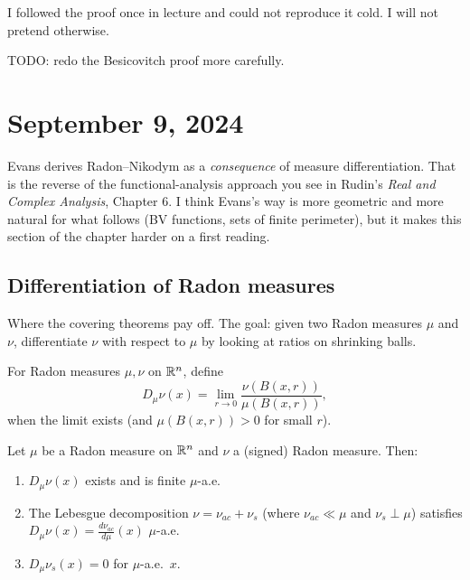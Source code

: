 I followed the proof once in lecture and could not reproduce it cold. I will not pretend otherwise.

TODO: redo the Besicovitch proof more carefully.


\section{September 9, 2024}\label{sec:lec4}

Evans derives Radon--Nikodym as a \emph{consequence} of measure
differentiation. That is the reverse of the functional-analysis approach you see in Rudin's \emph{Real and Complex Analysis}, Chapter 6. I think Evans's way is more geometric and more natural for what follows
(BV functions, sets of finite perimeter), but it makes this section of the
chapter harder on a first reading.

\subsection{Differentiation of Radon measures}\label{subsec:differentiation}

Where the covering theorems pay off. The goal: given two Radon
measures $\mu$ and $\nu$, differentiate $\nu$ with respect to $\mu$ by
looking at ratios on shrinking balls.

\begin{definition}\label{def:measure-deriv}
For Radon measures $\mu, \nu$ on $\mathbb{R}^n$, define
\[
  D_\mu \nu(x) = \lim_{r \to 0} \frac{\nu(B(x,r))}{\mu(B(x,r))},
\]
when the limit exists (and $\mu(B(x,r)) > 0$ for small $r$).
\end{definition}

\begin{theorem}%
\label{thm:lebesgue-besicovitch}
Let $\mu$ be a Radon measure on $\mathbb{R}^n$ and $\nu$ a (signed) Radon
measure. Then:
\begin{enumerate}[nosep]
  \item $D_\mu \nu(x)$ exists and is finite $\mu$-a.e.
  \item The Lebesgue decomposition $\nu = \nu_{ac} + \nu_s$ (where
        $\nu_{ac} \ll \mu$ and $\nu_s \perp \mu$) satisfies
        $D_\mu \nu(x) = \frac{d\nu_{ac}}{d\mu}(x)$ \; $\mu$-a.e.
  \item $D_\mu \nu_s(x) = 0$ for $\mu$-a.e.\ $x$.
\end{enumerate}
\end{theorem}

